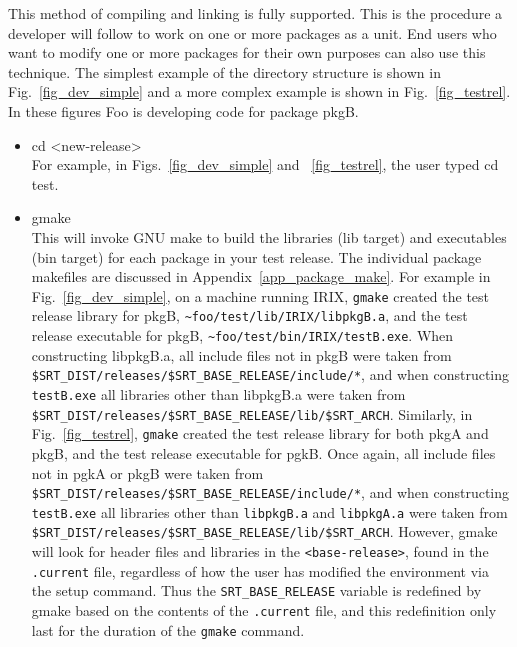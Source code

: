 \documentclass[12pt]{article}
\begin{document}
This method of compiling and linking is fully supported.
This is the procedure a developer will follow to work on one or more packages
as a unit.  End users who want to modify one or more packages for their own
purposes can also use this technique. The simplest example of the directory
structure is shown in Fig.~\ref{fig_dev_simple} and a more complex example is 
shown in Fig.~\ref{fig_testrel}.  In these figures Foo is developing code
for package {\ttfamily pkgB}.
\begin{itemize}

\item {\ttfamily cd <new-release>} \\
For example, in Figs.~\ref{fig_dev_simple} and ~\ref{fig_testrel},
the user typed {\ttfamily cd test}.

\item {\ttfamily gmake}\\
This will invoke GNU make to build the libraries (lib target) and 
executables (bin target) for each package in your test release. 
The individual package makefiles are discussed in
Appendix~\ref{app_package_make}. 
For example in Fig.~\ref{fig_dev_simple}, on a machine running IRIX, \texttt{gmake} 
created the test release library for pkgB, \verb|~foo/test/lib/IRIX/libpkgB.a|, 
and the test release executable for pkgB, \verb|~foo/test/bin/IRIX/testB.exe|. When
constructing libpkgB.a, all include files not in pkgB were taken from \\
\texttt{\$SRT\_DIST/releases/\$SRT\_BASE\_RELEASE/include/*}, and when constructing 
\verb|testB.exe| all libraries other
than libpkgB.a were taken from 
\texttt{\$SRT\_DIST/releases/\$SRT\_BASE\_RELEASE/lib/\$SRT\_ARCH}.  Similarly, in
Fig.~\ref{fig_testrel}, \texttt{gmake} created the test release library for
both pkgA and pkgB, and the test release executable for pgkB.  Once again,
all include files not in pgkA or pkgB were taken from 
\texttt{\$SRT\_DIST/releases/\$SRT\_BASE\_RELEASE/include/*}, and when constructing 
\texttt{testB.exe} all libraries other
than \texttt{libpkgB.a} and \texttt{libpkgA.a} were taken from 
\texttt{\$SRT\_DIST/releases/\$SRT\_BASE\_RELEASE/lib/\$SRT\_ARCH}.
However, gmake will look for header files and 
libraries in the \texttt{<base-release>}, found in the \texttt{.current} file, 
regardless of how the user has modified the environment via the setup command.
Thus the \texttt{SRT\_BASE\_RELEASE} variable is redefined by gmake
based on the contents of the \texttt{.current} file, and this redefinition only last
for the duration of the \texttt{gmake} command.
\end{itemize}
\end{document}
